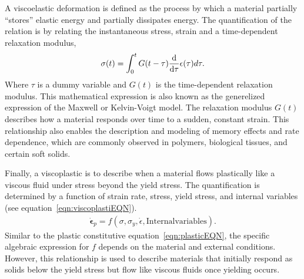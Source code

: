 A viscoelastic deformation is defined as the process by which a material partially ``stores'' elastic energy and partially dissipates energy.
The quantification of the relation is by relating the instantaneous stress, strain and a time-dependent relaxation modulus,
\begin{gather}
    \sigma(t) = \int_0^t G(t-\tau)\dv{\tau}\epsilon(\tau)d\tau\label{eqn:viscoelastiEQN}.
\end{gather}
Where $\tau$ is a dummy variable and $G(t)$ is the time-dependent relaxation modulus.
This mathematical expression is also known as the generelized expression of the Maxwell or Kelvin-Voigt model.
The relaxation modulus $G(t)$ describes how a material responds over time to a sudden, constant strain.
This relationship also enables the description and modeling of memory effects and rate dependence, which are commonly observed in polymers, biological tissues, and certain soft solids.

Finally, a viscoplastic is to describe when a material flows plastically like a viscous fluid under stress beyond the yield stress.
The quantification is determined by a function of strain rate, stress, yield stress, and internal variables (see equation~\eqref{eqn:viscoplastiEQN}).
\begin{gather}
    \dot{\bm{\epsilon}}_{p} = f\left(\sigma,\sigma_y,\dot{\epsilon},\mathrm{Internal variables}\right)\label{eqn:viscoplastiEQN}.
\end{gather}
Similar to the plastic constitutive equation~\eqref{eqn:plasticEQN}, the specific algebraic expression for $f$ depends on the material and external conditions. 
However, this relationship is used to describe materials that initially respond as solids below the yield stress but flow like viscous fluids once yielding occurs.

